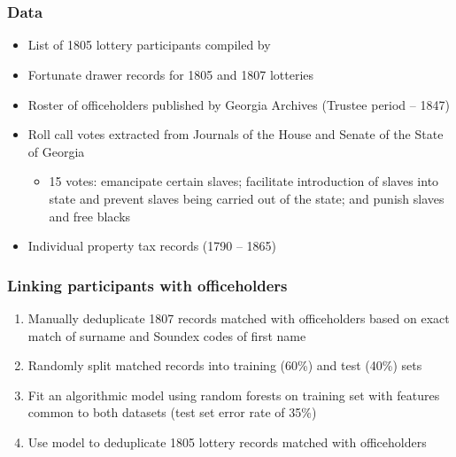 \documentclass{beamer}
\begin{document}
\section[Data]{}

\begin{frame}
\frametitle{Data}
\begin{itemize}
\item List of 1805 lottery participants compiled by \citet{graham2005}
\item Fortunate drawer records for 1805 and 1807 lotteries \citep{graham2004,graham2011}
\item Roster of officeholders published by Georgia Archives (Trustee period -- 1847)
\item Roll call votes extracted from Journals of the House and Senate of the State of Georgia
\begin{itemize}
\item  15 votes: emancipate certain slaves; facilitate introduction of slaves into state and prevent slaves being carried out of the state; and punish slaves and free blacks
\end{itemize}
\item Individual property tax records (1790 -- 1865)  \citep{archives1890,blair1926}
\end{itemize}
\end{frame}

\begin{frame}
\frametitle{Linking participants with officeholders}
\begin{enumerate}
\item Manually deduplicate 1807 records matched with officeholders based on exact match of surname and Soundex codes of first name
\item Randomly split matched records into training (60\%) and test (40\%) sets
\item  Fit an algorithmic model using random forests \citep{breiman2001} on training set with features common to both datasets (test set error rate of 35\%)
\item Use model to deduplicate 1805 lottery records matched with officeholders
\end{enumerate}
\end{frame}

\section[Estimation]{}
\end{document}
